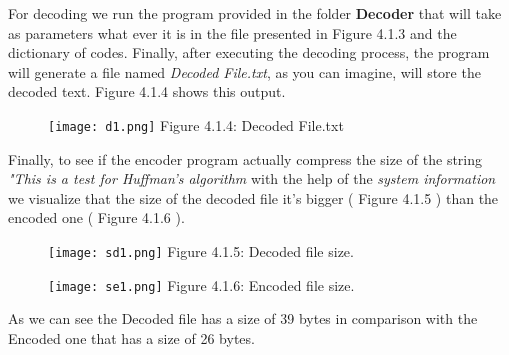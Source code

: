 For decoding we run the program provided in the folder {\bfseries Decoder} that will take as parameters what ever it is in the file presented in Figure 4.1.3 and the dictionary of codes. Finally, after executing the decoding process, the program will generate a file named {\itshape Decoded File.txt}, as you can imagine, will store the decoded text. Figure 4.1.4 shows this output. \hfill \break

\begin{figure}[H]
\texttt{[image: d1.png]}
\centering \linebreak \linebreak Figure 4.1.4: Decoded File.txt
\end{figure} \hfill \break

Finally, to see if the encoder program actually compress the size of the string {\itshape "This is a test for Huffman's algorithm} with the help of the {\itshape system information} we visualize that the size of the decoded file it's bigger ( Figure 4.1.5 ) than the encoded one ( Figure 4.1.6 ). \hfill \break

\begin{multicols}{2}
\begin{figure}[H]
\texttt{[image: sd1.png]}
\centering \linebreak \linebreak Figure 4.1.5: Decoded file size.
\end{figure} \hfill \break

\begin{figure}[H]
\texttt{[image: se1.png]}
\centering \linebreak \linebreak Figure 4.1.6: Encoded file size.
\end{figure} \hfill \break
\end{multicols} 

As we can see the Decoded file has a size of 39 bytes in comparison with the Encoded one that has a size of 26 bytes.

\pagebreak